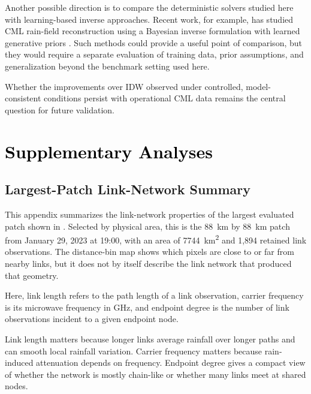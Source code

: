 \documentclass[11pt]{article}
\newif\ifthesisappendix
\newcommand{\cleartorecto}{%
  \clearpage
  \ifodd\value{page}
  \else
    \thispagestyle{empty}
    \null
    \clearpage
  \fi
}
\begin{document}
Another possible direction is to compare the deterministic solvers studied here with learning-based inverse approaches. Recent work, for example, has studied CML rain-field reconstruction using a Bayesian inverse formulation with learned generative priors \citep{moufad2026bayesian}. Such methods could provide a useful point of comparison, but they would require a separate evaluation of training data, prior assumptions, and generalization beyond the benchmark setting used here.

{\color{black}Whether the improvements over IDW observed under controlled, model-consistent conditions persist with operational CML data remains the central question for future validation.}

\cleartorecto
\pagestyle{plain}
\appendix
\thesisappendixtrue
\setcounter{figure}{0}
\renewcommand{\thefigure}{\thesection.\arabic{figure}}
\renewcommand{\theHfigure}{\thesection.\arabic{figure}}
\setcounter{table}{0}
\renewcommand{\thetable}{\thesection.\arabic{table}}
\renewcommand{\theHtable}{\thesection.\arabic{table}}
\section[Supplementary Analyses]{\textcolor{black}{Supplementary Analyses}}
\subsection{Largest-Patch Link-Network Summary}
{\color{black}This appendix summarizes the link-network properties of the largest evaluated patch shown in . Selected by physical area, this is the \SI{88}{km} by \SI{88}{km} patch from January 29, 2023 at 19:00, with an area of \SI{7744}{km^2} and 1,894 retained link observations. The distance-bin map shows which pixels are close to or far from nearby links, but it does not by itself describe the link network that produced that geometry.}

Here, link length refers to the path length of a link observation, carrier frequency is its microwave frequency in GHz, and endpoint degree is the number of link observations incident to a given endpoint node.

Link length matters because longer links average rainfall over longer paths and can smooth local rainfall variation. Carrier frequency matters because rain-induced attenuation depends on frequency. Endpoint degree gives a compact view of whether the network is mostly chain-like or whether many links meet at shared nodes.
\end{document}
